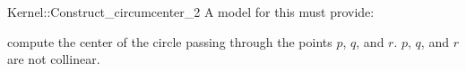 \begin{ccRefFunctionObjectConcept}{Kernel::Construct_circumcenter_2}
A model for this must provide:


 {compute the center of the circle passing through the points $p$, $q$, and $r$.
  \ccPrecond $p$, $q$, and $r$ are not collinear.}

\end{ccRefFunctionObjectConcept}
